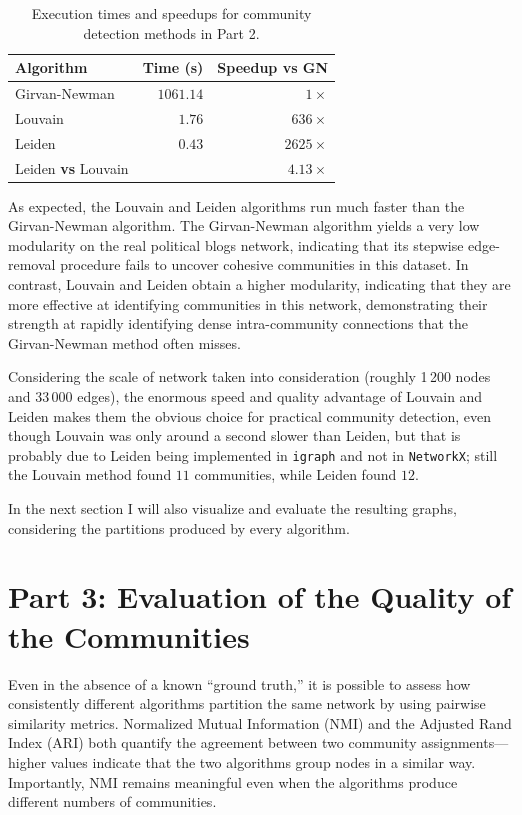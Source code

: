 \documentclass{article}
\begin{document}
\begin{table}[H]
  \centering
  \begin{tabular}{lrr}
    \toprule
    \textbf{Algorithm}     & \textbf{Time (s)} & \textbf{Speedup vs GN} \\
    \midrule
    Girvan-Newman          & $1061.14$     & $1\times$              \\
    Louvain                &   $1.76$      & $636\times$    \\
    Leiden                 &   $0.43$      & $2625\times$   \\
    \midrule
    Leiden \textbf{vs} Louvain      &                   & $4.13\times$      \\
    \bottomrule
  \end{tabular}
  \caption{Execution times and speedups for community detection methods in Part 2.}
  \label{tab:part2_times}
\end{table}



\vspace{0.5cm}
As expected, the Louvain and Leiden algorithms run much faster than the Girvan-Newman algorithm.
The Girvan-Newman algorithm yields a very low modularity on the real political blogs network, indicating that its stepwise edge-removal procedure fails to uncover cohesive communities in this dataset.
In contrast, Louvain and Leiden obtain a higher modularity, indicating that they are more effective at identifying communities in this network, demonstrating their strength at rapidly identifying dense intra-community connections that the Girvan-Newman method often misses.

Considering the scale of network taken into consideration (roughly 1\,200 nodes and 33\,000 edges), the enormous speed and quality advantage of Louvain and Leiden makes them the obvious choice for practical community detection, even though Louvain was only around a second slower than Leiden, but that is probably due to Leiden being implemented in \texttt{igraph} and not in \texttt{NetworkX}; still the Louvain method found $11$ communities, while Leiden found $12$.

In the next section I will also visualize and evaluate the resulting graphs, considering the partitions produced by every algorithm.


\section{Part 3: Evaluation of the Quality of the Communities}\label{sec:part3}
Even in the absence of a known “ground truth,” it is possible to assess how consistently different algorithms partition the same network by using pairwise similarity metrics. Normalized Mutual Information (NMI) and the Adjusted Rand Index (ARI) both quantify the agreement between two community assignments—higher values indicate that the two algorithms group nodes in a similar way. Importantly, NMI remains meaningful even when the algorithms produce different numbers of communities.
\end{document}
